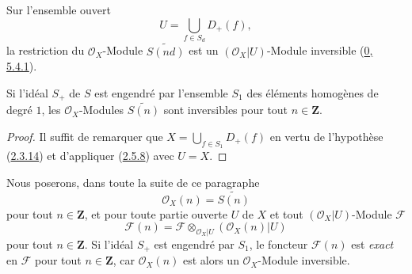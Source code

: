 \begin{corollary}[2.5.8]
\label{II.2.5.8-fr}
Sur l'ensemble ouvert
\[
  U=\bigcup_{f\in S_d}D_+(f),
\]
la restriction du $\mathcal{O}_X$-Module $\widetilde{S(nd)}$ est un
$(\mathcal{O}_X|U)$-Module inversible
(\hyperref[0.5.4.1-fr]{0, 5.4.1}).
\end{corollary}

\begin{corollary}[2.5.9]
\label{II.2.5.9-fr}
Si l'idéal $S_+$ de $S$ est engendré par l'ensemble $S_1$ des éléments
homogènes de degré $1$, les $\mathcal{O}_X$-Modules
$\widetilde{S(n)}$ sont inversibles pour tout $n\in\mathbf{Z}$.
\end{corollary}

\begin{proof}
Il suffit de remarquer que
$X=\bigcup_{f\in S_1}D_+(f)$ en vertu de l'hypothèse
(\hyperref[II.2.3.14-fr]{2.3.14}) et d'appliquer
(\hyperref[II.2.5.8-fr]{2.5.8}) avec $U=X$.
\end{proof}

\begin{env}[2.5.10]
\label{II.2.5.10-fr}
Nous poserons, dans toute la suite de ce paragraphe
\[
\label{II.2.5.10.1-fr}
  \mathcal{O}_X(n)=\widetilde{S(n)}
\tag{2.5.10.1}
\]
pour tout $n\in\mathbf{Z}$, et pour toute partie ouverte $U$ de $X$ et tout
$(\mathcal{O}_X|U)$-Module $\mathcal{F}$
\[
\label{II.2.5.10.2-fr}
  \mathcal{F}(n)=
  \mathcal{F}\otimes_{\mathcal{O}_X|U}(\mathcal{O}_X(n)|U)
\tag{2.5.10.2}
\]
pour tout $n\in\mathbf{Z}$. Si l'idéal $S_+$ est engendré par $S_1$, le
foncteur $\mathcal{F}(n)$ est \emph{exact} en
$\mathcal{F}$ pour tout $n\in\mathbf{Z}$, car $\mathcal{O}_X(n)$ est alors
un $\mathcal{O}_X$-Module inversible.
\end{env}

